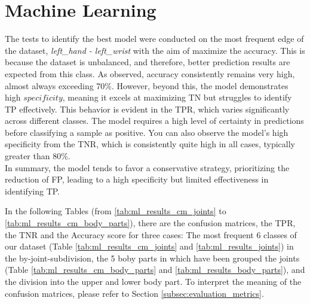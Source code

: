 \clearpage

\section{Machine Learning}

The tests to identify the best model were conducted on the most frequent edge of the dataset, \textit{left\_hand - left\_wrist} with the aim of maximize the accuracy.
This is because the dataset is unbalanced, and therefore, better prediction results are expected from this class.
As observed, accuracy consistently remains very high, almost always exceeding 70\%.
However, beyond this, the model demonstrates high $specificity$, meaning it excels at maximizing TN but struggles to identify TP effectively.
This behavior is evident in the TPR, which varies significantly across different classes.
The model requires a high level of certainty in predictions before classifying a sample as positive.
You can also observe the model's high specificity from the TNR, which is consistently quite high in all cases, typically greater than 80\%. \\
In summary, the model tends to favor a conservative strategy, prioritizing the reduction of FP, leading to a high specificity but limited effectiveness in identifying TP.

In the following Tables (from \ref{tab:ml_results_cm_joints} to \ref{tab:ml_results_cm_body_parts}), there are the confusion matrices, the TPR, the TNR and the Accuracy score for three cases: 
The most frequent 6 classes of our dataset (Table \ref{tab:ml_results_cm_joints} and \ref{tab:ml_results_joints}) in the by-joint-subdivision, the 5 boby parts in which have been grouped the joints (Table \ref{tab:ml_results_cm_body_parts} and \ref{tab:ml_results_body_parts}), and the division into the upper and lower body part.
To interpret the meaning of the confusion matrices, please refer to Section \ref{subsec:evaluation_metrics}.


